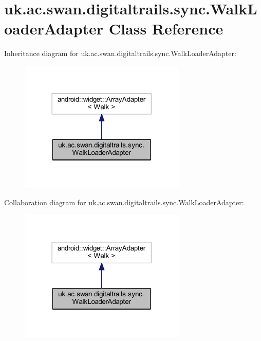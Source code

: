 \hypertarget{classuk_1_1ac_1_1swan_1_1digitaltrails_1_1sync_1_1_walk_loader_adapter}{\section{uk.\+ac.\+swan.\+digitaltrails.\+sync.\+Walk\+Loader\+Adapter Class Reference}
\label{classuk_1_1ac_1_1swan_1_1digitaltrails_1_1sync_1_1_walk_loader_adapter}
}


Inheritance diagram for uk.\+ac.\+swan.\+digitaltrails.\+sync.\+Walk\+Loader\+Adapter\+:\nopagebreak
\begin{figure}[H]
\begin{center}
\leavevmode
\includegraphics[width=225pt]{classuk_1_1ac_1_1swan_1_1digitaltrails_1_1sync_1_1_walk_loader_adapter__inherit__graph}
\end{center}
\end{figure}


Collaboration diagram for uk.\+ac.\+swan.\+digitaltrails.\+sync.\+Walk\+Loader\+Adapter\+:\nopagebreak
\begin{figure}[H]
\begin{center}
\leavevmode
\includegraphics[width=225pt]{classuk_1_1ac_1_1swan_1_1digitaltrails_1_1sync_1_1_walk_loader_adapter__coll__graph}
\end{center}
\end{figure}
